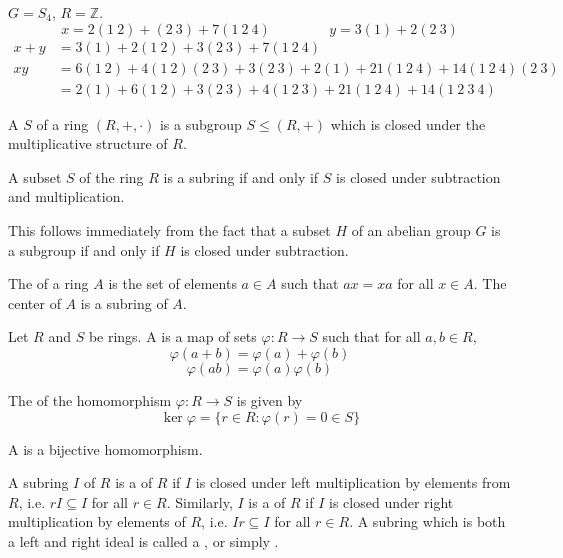 \documentclass{mathnotes}
\begin{document}
\begin{ex}
  $G=S_4$, $R=\mathbb{Z}$.
  $$x=2(1\ 2)+(2\ 3)+7(1\ 2\ 4)\hspace{50pt} y=3(1)+2(2\ 3)$$
  \begin{align*}
    x+y&=3(1)+2(1\ 2)+3(2\ 3)+7(1\ 2\ 4)\\
    xy&=6(1\ 2)+4(1\ 2)(2\ 3)+3(2\ 3)+2(1)+21(1\ 2\ 4)+14(1\ 2\ 4)(2\ 3)\\
      &=2(1)+6(1\ 2)+3(2\ 3)+4(1\ 2\ 3)+21(1\ 2\ 4)+14(1\ 2\ 3\ 4)
  \end{align*}
\end{ex}

\begin{bdefi}
  A  $S$ of a ring $(R,+,\cdot)$ is a subgroup $S\le(R,+)$
  which is closed under the multiplicative structure of $R$.
\end{bdefi}

\begin{prop}
  A subset $S$ of the ring $R$ is a subring if and only if $S$ is closed under
  subtraction and multiplication.
\end{prop}

\begin{pf}
  This follows immediately from the fact that a subset $H$ of an abelian group
  $G$ is a subgroup if and only if $H$ is closed under subtraction.
\end{pf}

\begin{defi}
  The  of a ring $A$ is the set of elements $a\in A$ such that
  $ax=xa$ for all $x\in A$. The center of $A$ is a subring of $A$.
\end{defi}

\begin{bdefi}
  Let $R$ and $S$ be rings. A  is a map of sets
  $\varphi:R\to S$ such that for all $a,b\in R$,
  $$\varphi(a+b)=\varphi(a)+\varphi(b)$$
  $$\varphi(ab)=\varphi(a)\varphi(b)$$
\end{bdefi}

\begin{defi}
  The  of the homomorphism $\varphi:R\to S$ is given by
  $$\ker\varphi=\{r\in R:\varphi(r)=0\in S\}$$
\end{defi}

\begin{defi}
  A  is a bijective homomorphism.
\end{defi}

\begin{bdefi}
  A subring $I$ of $R$ is a  of $R$ if $I$ is closed under
  left multiplication by elements from $R$, i.e. $rI\subseteq I$ for all $r\in
  R$. Similarly, $I$ is a  of $R$ if $I$ is closed under
  right multiplication by elements of $R$, i.e. $Ir\subseteq I$ for all $r\in
  R$. A subring which is both a left and right ideal is called a , or simply .
\end{bdefi}
\end{document}
